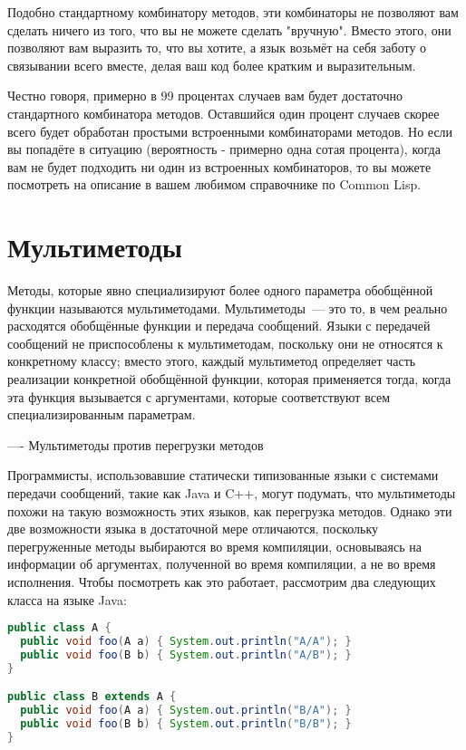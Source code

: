 Подобно стандартному комбинатору методов, эти комбинаторы не позволяют вам сделать ничего
из того, что вы не можете сделать "вручную".  Вместо этого, они позволяют вам выразить то,
что вы хотите, а язык возьмёт на себя заботу о связывании всего вместе, делая ваш код
более кратким и выразительным.

Честно говоря, примерно в 99 процентах случаев вам будет достаточно стандартного
комбинатора методов.  Оставшийся один процент случаев скорее всего будет обработан
простыми встроенными комбинаторами методов.  Но если вы попадёте в ситуацию (вероятность -
примерно одна сотая процента), когда вам не будет подходить ни один из встроенных
комбинаторов, то вы можете посмотреть на описание  в вашем
любимом справочнике по Common Lisp.

\section{Мультиметоды}

Методы, которые явно специализируют более одного параметра обобщённой функции называются
мультиметодами. Мультиметоды~--- это то, в чем реально расходятся обобщённые функции и
передача сообщений.  Языки с передачей сообщений не приспособлены к мультиметодам,
поскольку они не относятся к конкретному классу; вместо этого, каждый мультиметод
определяет часть реализации конкретной обобщённой функции, которая применяется тогда,
когда эта функция вызывается с аргументами, которые соответствуют всем специализированным
параметрам.

----
Мультиметоды против перегрузки методов

Программисты, использовавшие статически типизованные языки с системами передачи сообщений,
такие как Java и C++, могут подумать, что мультиметоды похожи на такую возможность этих
языков, как перегрузка методов.  Однако эти две возможности языка в достаточной мере
отличаются, поскольку перегруженные методы выбираются во время компиляции, основываясь на
информации об аргументах, полученной во время компиляции, а не во время исполнения.  Чтобы
посмотреть как это работает, рассмотрим два следующих класса на языке Java:

\begin{lstlisting}[language=java]
public class A {
  public void foo(A a) { System.out.println("A/A"); }
  public void foo(B b) { System.out.println("A/B"); }
}

public class B extends A {
  public void foo(A a) { System.out.println("B/A"); }
  public void foo(B b) { System.out.println("B/B"); }
}
\end{lstlisting}

